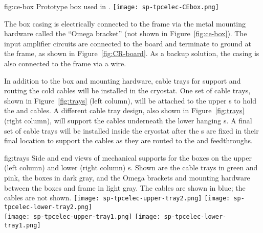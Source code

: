 \begin{dunefigure}
{fig:ce-box}
{Prototype  box used in .}
\texttt{[image: sp-tpcelec-CEbox.png]}
\end{dunefigure}

The  box casing is electrically connected to the 
 frame via the metal mounting hardware called the 
``Omega bracket'' (not shown in Figure~\ref{fig:ce-box}). The 
input amplifier circuits  are connected to the  board  
and terminate to ground at the  frame, as 
shown in Figure~\ref{fig:CR-board}.  As a backup solution, the casing is 
also connected to the  frame via a wire.

In addition to the  box and mounting hardware, cable trays 
for support and routing the cold cables will be installed in the 
cryostat. One set of cable trays, shown in Figure~\ref{fig:trays} 
(left column), will be attached to the upper s
to hold the  and  cables. A different cable 
tray design, also shown in Figure~\ref{fig:trays} (right column), 
will support the  cables underneath the 
lower hanging s. A final set of cable trays will be 
installed inside the cryostat after the s are 
fixed in their final location to support the cables as they are 
routed to the  and  feedthroughs.

\begin{dunefigure}
{fig:trays}
{Side and end views of mechanical supports for the  
boxes on the upper (left column) and lower (right column) 
s. Shown are the  cable trays in green and pink, 
the  boxes in dark gray, and the Omega brackets and mounting 
hardware between the  boxes and  frame in light gray.  
The  cables are shown in blue; the  cables are not shown.}
\texttt{[image: sp-tpcelec-upper-tray2.png]}
\hspace{5mm}
\texttt{[image: sp-tpcelec-lower-tray2.png]} \\
\texttt{[image: sp-tpcelec-upper-tray1.png]}
\hspace{5mm}
\texttt{[image: sp-tpcelec-lower-tray1.png]}
\end{dunefigure}


